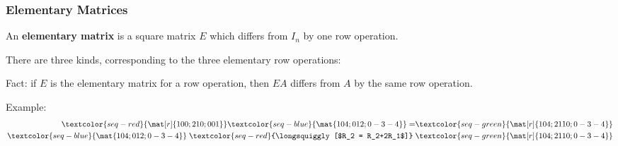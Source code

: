 \begin{frame}
\frametitle{Elementary Matrices}

\vskip-3mm
\begin{defn}
  An \textbf{elementary matrix} is a square matrix $E$ which differs from $I_n$
  by one row operation.
\end{defn}

\pause
There are three kinds, corresponding to the three elementary row operations:
\begin{webonly}
\begin{center}
\end{center}
\end{webonly}

\pause
\alert{Fact:} if $E$ is the elementary matrix for a row operation, then $EA$
differs from $A$ by the same row operation.

\pause\smallskip
\alert{Example:}\abovedisplayskip=1pt
\[\begin{split} \textcolor{seq-red}{\mat[r]{1 0 0; 2 1 0; 0 0 1}}
  \textcolor{seq-blue}{\mat{1 0 4; 0 1 2; 0 -3 -4}}
  =& \textcolor{seq-green}{\mat[r]{1 0 4; 2 1 10; 0 -3 -4}} \\
  \textcolor{seq-blue}{\mat{1 0 4; 0 1 2; 0 -3 -4}}
  \;\textcolor{seq-red}{\longsquiggly[$R_2 = R_2+2R_1$]}\;&
  \textcolor{seq-green}{\mat[r]{1 0 4; 2 1 10; 0 -3 -4}}
\end{split}\]

\end{frame}




